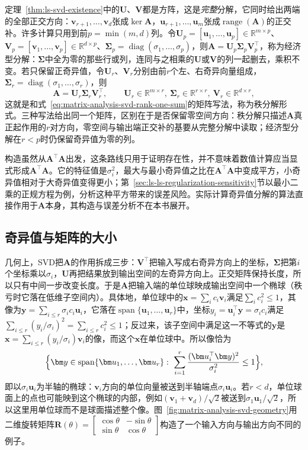 定理~\ref{thm:ls-svd-existence}中的$\bm U$、$\bm V$都是方阵，这是\emph{完整}分解，它同时给出两端的全部正交方向：$\bm v_{r+1},\ldots,\bm v_d$张成$\ker\bm A$，$\bm u_{r+1},\ldots,\bm u_m$张成$\operatorname{range}(\bm A)$的正交补。许多计算只用到前$p=\min(m,d)$列。令$\bm U_p=[\bm u_1,\ldots,\bm u_p]\in\mathbb R^{m\times p}$、$\bm V_p=[\bm v_1,\ldots,\bm v_p]\in\mathbb R^{d\times p}$、$\bm\Sigma_p=\operatorname{diag}(\sigma_1,\ldots,\sigma_p)$，则$\bm A=\bm U_p\bm\Sigma_p\bm V_p^\top$，称为经济型分解：$\bm\Sigma$中全为零的那些行或列，连同与之相乘的$\bm U$或$\bm V$的列一起删去，乘积不变。若只保留正奇异值，令$\bm U_r$、$\bm V_r$分别由前$r$个左、右奇异向量组成，$\bm\Sigma_r=\operatorname{diag}(\sigma_1,\ldots,\sigma_r)$，则
\[
 \bm A=\bm U_r\bm\Sigma_r\bm V_r^\top,\qquad
 \bm U_r\in\mathbb R^{m\times r},\ \bm\Sigma_r\in\mathbb R^{r\times r},\ \bm V_r\in\mathbb R^{d\times r},
\]
这就是和式~\eqref{eq:matrix-analysis-svd-rank-one-sum}的矩阵写法，称为秩分解形式。三种写法给出同一个矩阵，区别在于是否保留零空间方向：秩分解只描述$\bm A$真正起作用的$r$对方向，零空间与输出端正交补的基要从完整分解中读取；经济型分解在$r<p$时仍保留奇异值为零的列。

构造虽然从$\bm A^\top\bm A$出发，这条路线只用于证明存在性，并不意味着数值计算应当显式形成$\bm A^\top\bm A$。它的特征值是$\sigma_i^2$，最大与最小奇异值之比在$\bm A^\top\bm A$中变成平方，小奇异值相对于大奇异值变得更小；第~\ref{sec:ls-ls-regularization-sensitivity}节以最小二乘的正规方程为例，分析这种平方带来的误差风险。实际计算奇异值分解的算法直接作用于$\bm A$本身，其构造与误差分析不在本书展开。

\subsection{奇异值与矩阵的大小}
\label{sec:ls-svd-matrix-size}

几何上，SVD把$\bm A$的作用拆成三步：$\bm V^\top$把输入写成右奇异方向上的坐标，$\bm\Sigma$把第$i$个坐标乘以$\sigma_i$，$\bm U$再把结果放到输出空间的左奇异方向上。正交矩阵保持长度，所以只有中间一步改变长度。于是$\bm A$把输入端的单位球映成输出空间中一个椭球（秩亏时它落在低维子空间内）。具体地，单位球中的$\bm x=\sum_ic_i\bm v_i$满足$\sum_ic_i^2\leq1$，其像为$\bm y=\sum_{i\leq r}\sigma_ic_i\bm u_i$，它落在$\operatorname{span}\{\bm u_1,\ldots,\bm u_r\}$中，坐标$y_i=\bm u_i^\top\bm y=\sigma_ic_i$满足$\sum_{i\leq r}(y_i/\sigma_i)^2=\sum_{i\leq r}c_i^2\leq1$；反过来，该子空间中满足这一不等式的$\bm y$是$\bm x=\sum_{i\leq r}(y_i/\sigma_i)\bm v_i$的像，而这个$\bm x$在单位球中。所以像恰为
\[
 \Bigl\{\bm y\in\operatorname{span}\{\bm u_1,\ldots,\bm u_r\}:\ \sum_{i=1}^r\frac{(\bm u_i^\top\bm y)^2}{\sigma_i^2}\leq1\Bigr\},
\]
即以$\sigma_i\bm u_i$为半轴的椭球：$\bm v_i$方向的单位向量被送到半轴端点$\sigma_i\bm u_i$。若$r<d$，单位球面上的点也可能映到这个椭球的内部，例如$(\bm v_1+\bm v_d)/\sqrt2$被送到$\sigma_1\bm u_1/\sqrt2$，所以这里用单位球而不是球面描述整个像。图~\ref{fig:matrix-analysis-svd-geometry}用二维旋转矩阵$\bm R(\theta)=\left[\begin{smallmatrix}\cos\theta&-\sin\theta\\\sin\theta&\cos\theta\end{smallmatrix}\right]$构造了一个输入方向与输出方向不同的例子。

